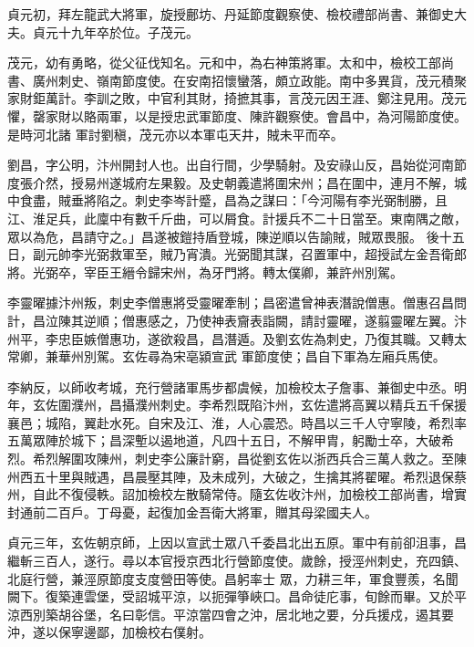 \begin{pinyinscope}
 貞元初，拜左龍武大將軍，旋授鄜坊、丹延節度觀察使、檢校禮部尚書、兼御史大夫。貞元十九年卒於位。子茂元。



 茂元，幼有勇略，從父征伐知名。元和中，為右神策將軍。太和中，檢校工部尚書、廣州刺史、嶺南節度使。在安南招懷蠻落，頗立政能。南中多異貨，茂元積聚家財鉅萬計。李訓之敗，中官利其財，掎摭其事，言茂元因王涯、鄭注見用。茂元懼，罄家財以賂兩軍，以是授忠武軍節度、陳許觀察使。會昌中，為河陽節度使。是時河北諸
 軍討劉稹，茂元亦以本軍屯天井，賊未平而卒。



 劉昌，字公明，汴州開封人也。出自行間，少學騎射。及安祿山反，昌始從河南節度張介然，授易州遂城府左果毅。及史朝義遣將圍宋州；昌在圍中，連月不解，城中食盡，賊垂將陷之。刺史李岑計蹙，昌為之謀曰：「今河陽有李光弼制勝，且江、淮足兵，此廩中有數千斤曲，可以屑食。計援兵不二十日當至。東南隅之敵，眾以為危，昌請守之。」昌遂被鎧持盾登城，陳逆順以告諭賊，賊眾畏服。
 後十五日，副元帥李光弼救軍至，賊乃宵潰。光弼聞其謀，召置軍中，超授試左金吾衛郎將。光弼卒，宰臣王縉令歸宋州，為牙門將。轉太僕卿，兼許州別駕。



 李靈曜據汴州叛，刺史李僧惠將受靈曜牽制；昌密遣曾神表潛說僧惠。僧惠召昌問計，昌泣陳其逆順；僧惠感之，乃使神表齎表詣闕，請討靈曜，遂翦靈曜左翼。汴州平，李忠臣嫉僧惠功，遂欲殺昌，昌潛遁。及劉玄佐為刺史，乃復其職。又轉太常卿，兼華州別駕。玄佐尋為宋亳潁宣武
 軍節度使；昌自下軍為左廂兵馬使。



 李納反，以師收考城，充行營諸軍馬步都虞候，加檢校太子詹事、兼御史中丞。明年，玄佐圍濮州，昌攝濮州刺史。李希烈既陷汴州，玄佐遣將高翼以精兵五千保援襄邑；城陷，翼赴水死。自宋及江、淮，人心震恐。時昌以三千人守寧陵，希烈率五萬眾陣於城下；昌深塹以遏地道，凡四十五日，不解甲胄，躬勵士卒，大破希烈。希烈解圍攻陳州，刺史李公廉計窮，昌從劉玄佐以浙西兵合三萬人救之。至陳
 州西五十里與賊遇，昌晨壓其陣，及未成列，大破之，生擒其將翟曜。希烈退保蔡州，自此不復侵軼。詔加檢校左散騎常侍。隨玄佐收汴州，加檢校工部尚書，增實封通前二百戶。丁母憂，起復加金吾衛大將軍，贈其母梁國夫人。



 貞元三年，玄佐朝京師，上因以宣武士眾八千委昌北出五原。軍中有前卻沮事，昌繼斬三百人，遂行。尋以本官授京西北行營節度使。歲餘，授涇州刺史，充四鎮、北庭行營，兼涇原節度支度營田等使。昌躬率士
 眾，力耕三年，軍食豐羨，名聞闕下。復築連雲堡，受詔城平涼，以扼彈箏峽口。昌命徒庀事，旬餘而畢。又於平涼西別築胡谷堡，名曰彰信。平涼當四會之沖，居北地之要，分兵援戍，遏其要沖，遂以保寧邊鄙，加檢校右僕射。




\end{pinyinscope}
